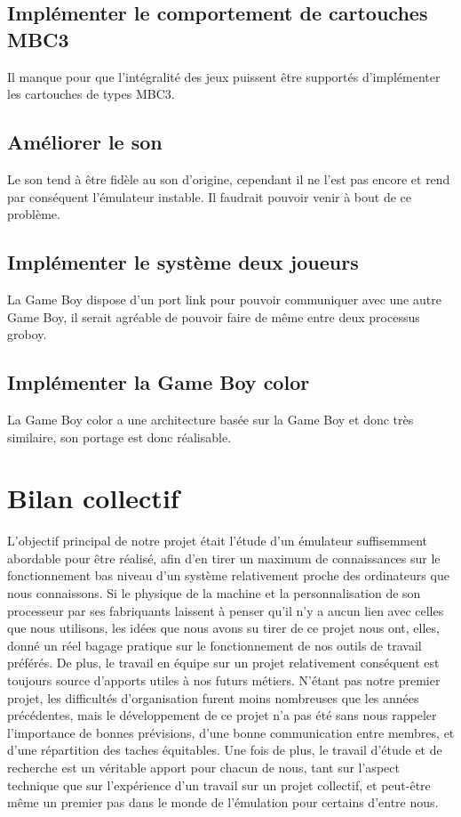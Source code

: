 \documentclass{report}
\begin{document}
\subsection*{Implémenter le comportement de cartouches MBC3}
Il manque pour que l'intégralité des jeux puissent être supportés d'implémenter les cartouches de types MBC3.
\subsection*{Améliorer le son}
Le son tend à être fidèle au son d'origine, cependant il ne l'est pas encore et rend par conséquent l'émulateur instable. Il faudrait pouvoir venir à bout de ce problème.
\subsection*{Implémenter le système deux joueurs}
La Game Boy dispose d'un port link pour pouvoir communiquer avec une autre Game Boy, il serait agréable de pouvoir faire de même entre deux processus groboy.
\subsection*{Implémenter la Game Boy color}
La Game Boy color a une architecture basée sur la Game Boy et donc très similaire, son portage est donc réalisable. 
\section*{Bilan collectif}
L'objectif principal de notre projet était l'étude d'un émulateur suffisemment abordable pour être réalisé, afin d'en tirer un maximum de connaissances sur le fonctionnement bas niveau d'un système relativement proche des ordinateurs que nous connaissons.
Si le physique de la machine et la personnalisation de son processeur par ses fabriquants laissent à penser qu'il n'y a aucun lien avec celles que nous utilisons, les idées que nous avons su tirer de ce projet nous ont, elles, donné un réel bagage pratique sur le fonctionnement de nos outils de travail préférés. 
De plus, le travail en équipe sur un projet relativement conséquent est toujours source d'apports utiles à nos futurs métiers. N'étant pas notre premier projet, les difficultés d'organisation furent moins nombreuses que les années précédentes, mais le développement de ce projet n'a pas été sans nous rappeler l'importance de bonnes prévisions, d'une bonne communication entre membres, et d'une répartition des taches équitables.
Une fois de plus, le travail d'étude et de recherche est un véritable apport pour chacun de nous, tant sur l'aspect technique que sur l'expérience d'un travail sur un projet collectif, et peut-être même un premier pas dans le monde de l'émulation pour certains d'entre nous.
\end{document}
